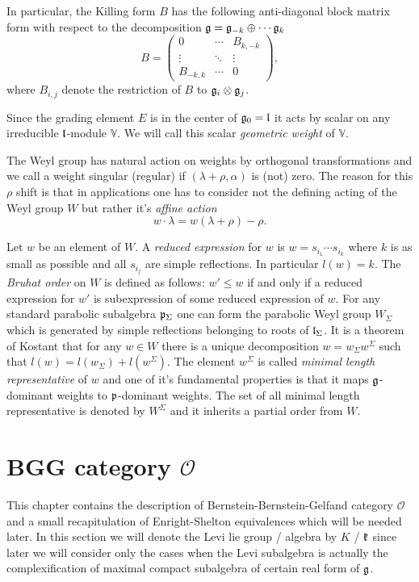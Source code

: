 In particular, the Killing form $B$ has the following anti-diagonal block matrix form with respect to the decomposition $\mathfrak{g}=\mathfrak{g}_{-k}\oplus\cdots \mathfrak{g}_k$
\[
 B = \begin{pmatrix}
      0 & \cdots & B_{k,-k} \\
      \vdots &  \ddots & \vdots \\
      B_{-k,k} & \cdots&0
     \end{pmatrix},
\]
where $B_{i,j}$ denote the restriction of $B$ to $\mathfrak{g}_i\otimes \mathfrak{g}_j$.

Since the grading element $E$ is in the center of $\mathfrak{g}_0 = \mathfrak{l}$ it acts by scalar on any irreducible $\mathfrak{l}$-module $\mathbb{V}$. We will call this scalar \emph{geometric weight} of $\mathbb{V}$.

The Weyl group has natural action on weights by orthogonal transformations and we call a weight singular (regular) if $(\lambda + \rho, \alpha)$ is (not) zero. The reason for this $\rho$ shift is that in applications one has to consider not the defining acting of the Weyl group $W$ but rather it's \emph{affine action} 
\[
 w \cdot \lambda = w(\lambda + \rho) - \rho.
\]

Let $w$ be an element of $W$. A \emph{reduced expression} for $w$ is $w = s_{i_1} \cdots s_{i_k}$ where $k$ is as small as possible and all $s_{i_j}$ are simple reflections. In particular $l(w) = k$. The \emph{Bruhat order} on $W$ is defined as follows: $w' \leq w$ if and only if a reduced expression for $w'$ is subexpression of some reduced expression of $w.$ For any standard parabolic subalgebra $\mathfrak{p}_\Sigma$ one can form the parabolic Weyl group $W_\Sigma$ which is generated by simple reflections belonging to roots of $\mathfrak{l}_\Sigma$. It is a theorem of Kostant \cite{kostant_lie_1961} that for any $w \in W$ there is a unique decomposition $w = w_\Sigma w^\Sigma$ such that $l(w) = l(w_\Sigma) + l(w^\Sigma)$. The element $w^\Sigma$ is called \emph{minimal length representative} of $w$ and one of it's fundamental properties is that it maps $\mathfrak{g}$-dominant weights to $\mathfrak{p}$-dominant weights. The set of all minimal length representative is denoted by $W^\Sigma$ and it inherits a partial order from $W$.


\section[BGG category O]{BGG category $\mathcal{O}$}

This chapter contains the description of Bernstein-Bernstein-Gelfand category $\mathcal{O}$ and a small recapitulation of Enright-Shelton equivalences which will be needed later. In this section we will denote the Levi lie group / algebra by $K$ / $\mathfrak{k}$ since later we will consider only the cases when the Levi subalgebra is actually the complexification of maximal compact subalgebra of certain real form of $\mathfrak{g}$.

